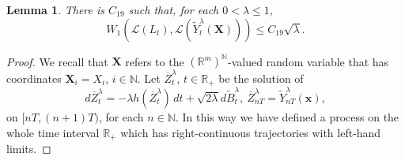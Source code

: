 \documentclass[a4paper,draft]{article}
\newtheorem{lemma}[theorem]{Lemma}
\begin{document}
\begin{lemma}\label{vizier} There is 
$C_{19}$ such that,
for each $0<\lambda\leq 1$,
$$
W_1(\mathcal{L}(L_t),\mathcal{L}(\tilde{Y}^{\lambda}_t(\mathbf{X})))\leq C_{19}\sqrt{\lambda}.
$$
\end{lemma}
\begin{proof} We recall that 
$\mathbf{X}$ refers to the $(\mathbb{R}^m)^{\mathbb{N}}$-valued random variable that has coordinates
$\mathbf{X}_i=X_i$, $i\in\mathbb{N}$.
Let $\overline{Z}^{\lambda}_t$, $t\in\mathbb{R}_+$ be the solution of
$$
d\overline{Z}^{\lambda}_t=-\lambda h(\overline{Z}^{\lambda}_t)\, dt+\sqrt{2\lambda}d\tilde{B}^{\lambda}_t,\
\overline{Z}^{\lambda}_{nT}=\tilde{Y}^{\lambda}_{nT}(\mathbf{x}),
$$
on $[nT,(n+1)T)$, for each $n\in\mathbb{N}$. In this way we have defined
a process on the whole time interval $\mathbb{R}_+$ which has right-continuous trajectories with left-hand limits.


\end{proof}
\end{document}
